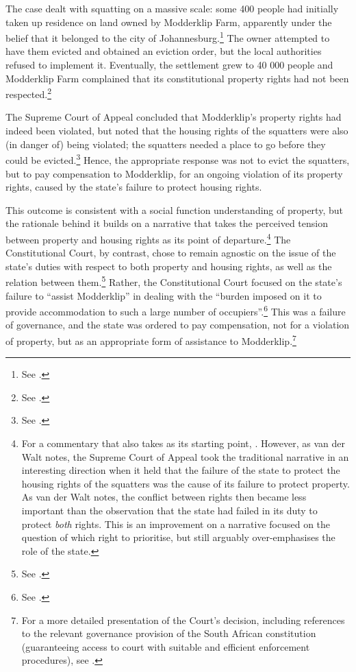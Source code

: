 The case dealt with squatting on a massive scale: some 400 people had initially taken up residence on land owned by Modderklip Farm, apparently under the belief that it belonged to the city of Johannesburg.\footnote{See \cite[4]{modderklip05}.} The owner attempted to have them evicted and obtained an eviction order, but the local authorities refused to implement it. Eventually, the settlement grew to 40 000 people and Modderklip Farm complained that its constitutional property rights had not been respected.\footnote{See \cite[8]{modderklip05}.}

The Supreme Court of Appeal concluded that Modderklip's property rights had indeed been violated, but noted that the housing rights of the squatters were also (in danger of) being violated; the squatters needed a place to go before they could be evicted.\footnote{See \cite[21-26]{modderklip04}.} Hence, the appropriate response was not to evict the squatters, but to pay compensation to Modderklip, for an ongoing violation of its property rights, caused by the state's failure to protect housing rights.

This outcome is consistent with a social function understanding of property, but the rationale behind it builds on a narrative that takes the perceived tension between property and housing rights as its point of departure.\footnote{For a commentary that also takes as its starting point, \cite[152-156]{walt05}. However, as van der Walt notes, the Supreme Court of Appeal took the traditional narrative in an interesting direction when it held that the failure of the state to protect the housing rights of the squatters was the cause of its failure to protect property. As van der Walt notes, the conflict between rights then became less important than the observation that the state had failed in its duty to protect {\it both} rights. This is an improvement on a narrative focused on the question of which right to prioritise, but still arguably over-emphasises the role of the state.} The Constitutional Court, by contrast, chose to remain agnostic on the issue of the state's duties with respect to both property and housing rights, as well as the relation between them.\footnote{See \cite[25]{modderklip05}.} Rather, the Constitutional Court focused on the state's failure to ``assist Modderklip'' in dealing with the ``burden imposed on it to provide accommodation to such a large number of occupiers''.\footnote{See \cite[49]{modderklip05}.} This was a failure of governance, and the state was ordered to pay compensation, not for a violation of property, but as an appropriate form of assistance to Modderklip.\footnote{For a more detailed presentation of the Court's decision, including references to the relevant governance provision of the South African constitution (guaranteeing access to court with suitable and efficient enforcement procedures), see \cite[156-158]{walt05}.} 

